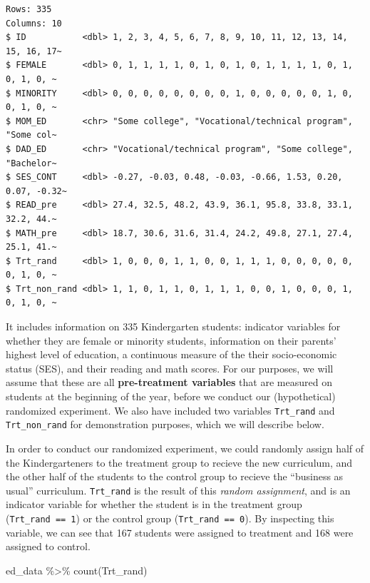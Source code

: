 \documentclass[
  letterpaper,
  DIV=11,
  numbers=noendperiod]{scrreprt}
\newenvironment{Shaded}{\begin{snugshade}}{\end{snugshade}}
\newcommand{\FunctionTok}[1]{\textcolor[rgb]{0.28,0.35,0.67}{#1}}
\newcommand{\NormalTok}[1]{\textcolor[rgb]{0.00,0.23,0.31}{#1}}
\newcommand{\SpecialCharTok}[1]{\textcolor[rgb]{0.37,0.37,0.37}{#1}}
\theoremstyle{definition}
\theoremstyle{remark}
\begin{document}
\begin{verbatim}
Rows: 335
Columns: 10
$ ID           <dbl> 1, 2, 3, 4, 5, 6, 7, 8, 9, 10, 11, 12, 13, 14, 15, 16, 17~
$ FEMALE       <dbl> 0, 1, 1, 1, 1, 0, 1, 0, 1, 0, 1, 1, 1, 1, 0, 1, 0, 1, 0, ~
$ MINORITY     <dbl> 0, 0, 0, 0, 0, 0, 0, 0, 1, 0, 0, 0, 0, 0, 1, 0, 0, 1, 0, ~
$ MOM_ED       <chr> "Some college", "Vocational/technical program", "Some col~
$ DAD_ED       <chr> "Vocational/technical program", "Some college", "Bachelor~
$ SES_CONT     <dbl> -0.27, -0.03, 0.48, -0.03, -0.66, 1.53, 0.20, 0.07, -0.32~
$ READ_pre     <dbl> 27.4, 32.5, 48.2, 43.9, 36.1, 95.8, 33.8, 33.1, 32.2, 44.~
$ MATH_pre     <dbl> 18.7, 30.6, 31.6, 31.4, 24.2, 49.8, 27.1, 27.4, 25.1, 41.~
$ Trt_rand     <dbl> 1, 0, 0, 0, 1, 1, 0, 0, 1, 1, 1, 0, 0, 0, 0, 0, 0, 1, 0, ~
$ Trt_non_rand <dbl> 1, 1, 0, 1, 1, 0, 1, 1, 1, 0, 0, 1, 0, 0, 0, 1, 0, 1, 0, ~
\end{verbatim}

It includes information on 335 Kindergarten students: indicator
variables for whether they are female or minority students, information
on their parents' highest level of education, a continuous measure of
the their socio-economic status (SES), and their reading and math
scores. For our purposes, we will assume that these are all
\textbf{pre-treatment variables} that are measured on students at the
beginning of the year, before we conduct our (hypothetical) randomized
experiment. We also have included two variables \texttt{Trt\_rand} and
\texttt{Trt\_non\_rand} for demonstration purposes, which we will
describe below.

In order to conduct our randomized experiment, we could randomly assign
half of the Kindergarteners to the treatment group to recieve the new
curriculum, and the other half of the students to the control group to
recieve the ``business as usual'' curriculum. \texttt{Trt\_rand} is the
result of this \emph{random assignment}, and is an indicator variable
for whether the student is in the treatment group
(\texttt{Trt\_rand\ ==\ 1}) or the control group
(\texttt{Trt\_rand\ ==\ 0}). By inspecting this variable, we can see
that 167 students were assigned to treatment and 168 were assigned to
control.

\begin{Shaded}
\begin{Highlighting}[]
\NormalTok{ed\_data }\SpecialCharTok{\%\textgreater{}\%} 
  \FunctionTok{count}\NormalTok{(Trt\_rand)}
\end{Highlighting}
\end{Shaded}
\end{document}
